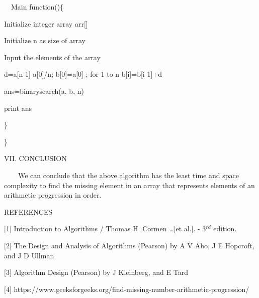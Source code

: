 \documentclass[12pt,a4paper]{article}
\begin{document}
\begin{multicols}{2}
\ \ Main function()\{ 

\quad Initialize integer array arr$[$$]$

\quad  Initialize n as size of array

\quad Input the elements of the array 

\quad d=a[n-1]-a[0]/n;
\quad b[0]=a[0] ; 
\quad for 1 to n b[i]=b[i-1]+d

\quad ans=binarysearch(a, b, n)

\quad print ans

\}



\} 



\begin{center}VII. CONCLUSION\end{center}

\ \ \ \ We can conclude that the above algorithm has the least time and space 
complexity to find the missing element in an array that represents elements of an arithmetic progression in order.


\begin{center}REFERENCES\end{center}

$[$1$]$ Introduction to Algorithms / Thomas H. Cormen \ldots $[$et 
al.$]$. - 3$^{rd}$ edition.

$[$2$]$ The Design and Analysis of Algorithms (Pearson) by A V Aho, J E 
Hopcroft, and J D Ullman 

$[$3$]$ Algorithm Design (Pearson) by J Kleinberg, and E Tard

$[$4$]$ https://www.geeksforgeeks.org/find-missing-number-arithmetic-progression/

\end{multicols}
\end{document}
